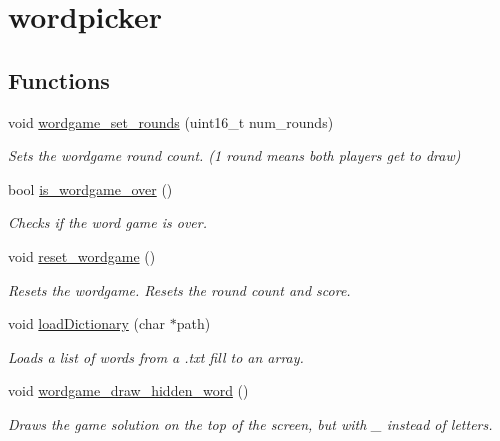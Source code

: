 \hypertarget{group__wordpicker}{}\section{wordpicker}
\label{group__wordpicker}
\subsection*{Functions}
\begin{DoxyCompactItemize}
\item 
void \mbox{\hyperlink{group__wordpicker_ga1a2589aeb050207591f4e9645a352296}{wordgame\+\_\+set\+\_\+rounds}} (uint16\+\_\+t num\+\_\+rounds)
\begin{DoxyCompactList}\small\item\em Sets the wordgame round count. (1 round means both players get to draw) \end{DoxyCompactList}\item 
bool \mbox{\hyperlink{group__wordpicker_gad71f6bf17413141406dc7bb39628ae61}{is\+\_\+wordgame\+\_\+over}} ()
\begin{DoxyCompactList}\small\item\em Checks if the word game is over. \end{DoxyCompactList}\item 
void \mbox{\hyperlink{group__wordpicker_ga974e197af1626e02aabe31f7eeb6ba85}{reset\+\_\+wordgame}} ()
\begin{DoxyCompactList}\small\item\em Resets the wordgame. Resets the round count and score. \end{DoxyCompactList}\item 
void \mbox{\hyperlink{group__wordpicker_ga7ae040ad09e5ee83b7d121c4290d79b6}{load\+Dictionary}} (char $\ast$path)
\begin{DoxyCompactList}\small\item\em Loads a list of words from a .txt fill to an array. \end{DoxyCompactList}\item 
void \mbox{\hyperlink{group__wordpicker_gace6e5a32a72b4f595817f2275c431401}{wordgame\+\_\+draw\+\_\+hidden\+\_\+word}} ()
\begin{DoxyCompactList}\small\item\em Draws the game solution on the top of the screen, but with \textquotesingle{}\+\_\+\textquotesingle{} instead of letters. \end{DoxyCompactList}\item 

\end{DoxyCompactItemize}
